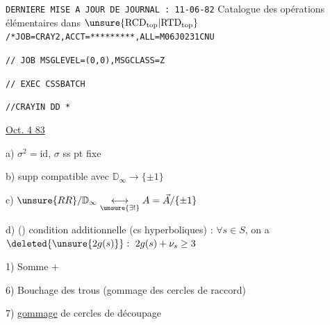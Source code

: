 \texttt{DERNIERE MISE A JOUR DE JOURNAL : 11-06-82}
Catalogue des opérations élémentaires dans $\unsure{\mathrm{RCD}_{\mathrm{top}}|\mathrm{RTD}_{\mathrm{top}}}$
\texttt{/*JOB=CRAY2,ACCT=*********,ALL=M06}\qquad\texttt{J0231CNU}

\texttt{// JOB MSGLEVEL=(0,0),MSGCLASS=Z}

\texttt{// EXEC CSSBATCH}

\texttt{//CRAYIN DD *}

\uline{Oct. 4 83}


a) $\sigma^2=\mathrm{id}$, $\sigma$ ss pt fixe

b) supp compatible avec $\mathbb D_\infty\longrightarrow\{\pm1\}$

c) $\unsure{RR}/\mathbb D_\infty\underset{\unsure{\exists!}}{\longleftrightarrow}
 A=\vec A/\{\pm1\}$

d) () condition additionnelle (cs hyperboliques) :
$\forall s\in S$, on a
$\deleted{\unsure{2g(s)}}:\ 2g(s)+\nu_s\ge3$
\margin{\[
3\unsure{g_s|g_p}-3+\nu_s\ge0
\]
\[
2\unsure{g_s|g_p}-2+\nu_s\ge1
\]
\[
2g_s+\nu_s\ge3
\]}

1) Somme $+$

6) Bouchage des trous (gommage des cercles de raccord)

7) \uline{gommage} de cercles de découpage

